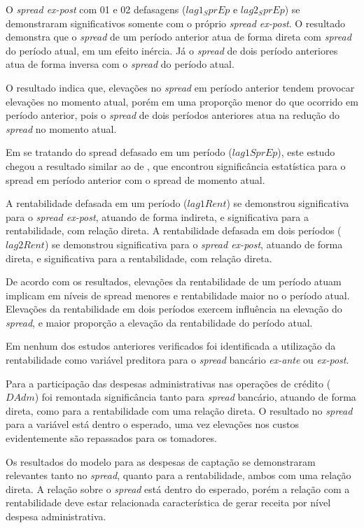 \documentclass[
  12pt,
  12pt,
  openright,
  oneside,
  a4paper,
  chapter=TITLE,
  section=TITLE,
  subsection=TITLE,
  subsubsection=TITLE,
  portugues,
  sumario=tradicional]{abntex2}
\begin{document}
\parindent 1.50cm

O \emph{spread ex-post} com 01 e 02 defasagens (\(lag1_SprEp\) e \(lag2_SprEp\)) se demonstraram significativos somente com o próprio \emph{spread ex-post}. O resultado demonstra que o \emph{spread} de um período anterior atua de forma direta com \emph{spread} do período atual, em um efeito inércia. Já o \emph{spread} de dois período anteriores atua de forma inversa com o \emph{spread} do período atual.

O resultado indica que, elevações no \emph{spread} em período anterior tendem provocar elevações no momento atual, porém em uma proporção menor do que ocorrido em período anterior, pois o \emph{spread} de dois períodos anteriores atua na redução do \emph{spread} no momento atual.

Em se tratando do spread defasado em um período (\(lag1SprEp\)), este estudo chegou a resultado similar ao de \textcite{dantas:2012}, que encontrou significância estatística para o spread em período anterior com o spread de momento atual.

A rentabilidade defasada em um período (\(lag1Rent\)) se demonstrou significativa para o \emph{spread ex-post}, atuando de forma indireta, e significativa para a rentabilidade, com relação direta. A rentabilidade defasada em dois períodos (\(lag2Rent\)) se demonstrou significativa para o \emph{spread ex-post}, atuando de forma direta, e significativa para a rentabilidade, com relação direta.

De acordo com os resultados, elevações da rentabilidade de um período atuam implicam em níveis de spread menores e rentabilidade maior no o período atual. Elevações da rentabilidade em dois períodos exercem influência na elevação do \emph{spread}, e maior proporção a elevação da rentabilidade do período atual.

Em nenhum dos estudos anteriores verificados foi identificada a utilização da rentabilidade como variável preditora para o \emph{spread} bancário \emph{ex-ante} ou \emph{ex-post}.

Para a participação das despesas administrativas nas operações de crédito (\(DAdm\)) foi remontada significância tanto para \emph{spread} bancário, atuando de forma direta, como para a rentabilidade com uma relação direta. O resultado no \emph{spread} para a variável está dentro o esperado, uma vez elevações nos custos evidentemente são repassados para os tomadores.

Os resultados do modelo para as despesas de captação se demonstraram relevantes tanto no \emph{spread}, quanto para a rentabilidade, ambos com uma relação direta. A relação sobre o \emph{spread} está dentro do esperado, porém a relação com a rentabilidade deve estar relacionada característica de gerar receita por nível despesa administrativa.
\end{document}
